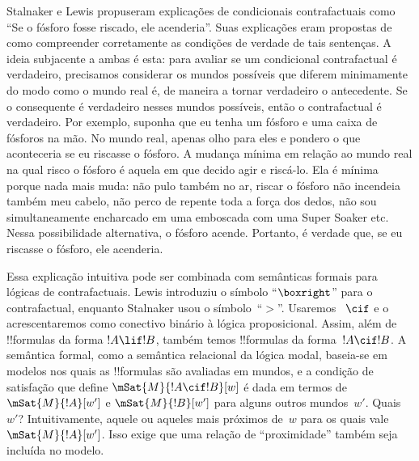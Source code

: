 \documentclass[../../../include/open-logic-section]{subfiles}
\begin{document}


Stalnaker e Lewis propuseram explicações de condicionais contrafactuais
como ``Se o fósforo fosse riscado, ele acenderia''. Suas explicações
eram propostas de como compreender corretamente as condições de verdade de
tais sentenças. A ideia subjacente a ambas é esta: para avaliar
se um condicional contrafactual é verdadeiro, precisamos considerar
os mundos possíveis que diferem minimamente do modo como o
mundo real é, de maneira a tornar verdadeiro o antecedente. Se o consequente é
verdadeiro nesses mundos possíveis, então o contrafactual é verdadeiro. Por
exemplo, suponha que eu tenha um fósforo e uma caixa de fósforos na mão. No
mundo real, apenas olho para eles e pondero o que aconteceria se eu
riscasse o fósforo. A mudança mínima em relação ao mundo real
na qual risco o fósforo é aquela em que decido agir e riscá-lo.
Ela é mínima porque nada mais muda: não pulo também
no ar, riscar o fósforo não incendeia também meu cabelo, não
perco de repente toda a força dos dedos, não sou simultaneamente
encharcado em uma emboscada com uma Super Soaker etc. Nessa possibilidade
alternativa, o fósforo acende. Portanto, é verdade que, se eu
riscasse o fósforo, ele acenderia.

Essa explicação intuitiva pode ser combinada com semânticas formais para lógicas
de contrafactuais. Lewis introduziu o símbolo ``$\boxright$'' para
o contrafactual, enquanto Stalnaker usou o símbolo~``$>$''. Usaremos
~$\cif$ e o acrescentaremos como conectivo binário à lógica
proposicional. Assim, além de !!{formula}s da forma $!A \lif
!B$, também temos !!{formula}s da forma~$!A \cif !B$. A semântica formal,
como a semântica relacional da lógica modal, baseia-se em modelos nos
quais as !!{formula}s são avaliadas em mundos, e a condição de satisfação
que define $\mSat{M}{!A \cif !B}[w]$ é dada em termos de
$\mSat{M}{!A}[w']$ e $\mSat{M}{!B}[w']$ para alguns outros
mundos~$w'$. Quais $w'$? Intuitivamente, aquele ou aqueles mais próximos de~$w$
para os quais vale~$\mSat{M}{!A}[w']$. Isso exige que uma relação
de ``proximidade'' também seja incluída no modelo.
\end{document}
